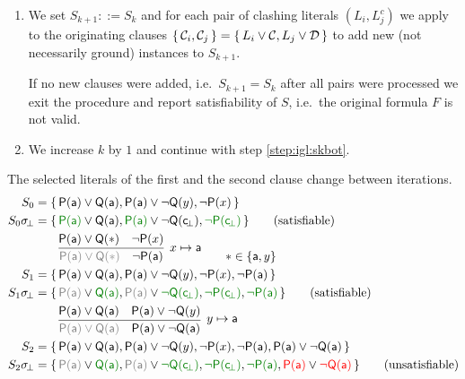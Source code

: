 \begin{procedure}
\begin{enumerate}
		\item We set $S_{k+1} ::= S_k$ and for each pair of clashing literals $(L_i, L^c_j)$
		we apply \InstGen to the originating clauses
		$\{\, \mathcal{C}_{i}, \mathcal{C}_{j}\, \} = \{\,L_i\lor\mathcal{C}, L_j\lor\mathcal{D}\,\}$
		to add new (not necessarily ground) instances to $S_{k+1}$.

		If no new clauses were added, i.e.~$S_{k+1} = S_k$ after all pairs were processed we exit the procedure and report {\myem satisfiability} of $S$, i.e.~the original formula $F$ is not valid.

		\item We increase $k$ by $1$ and continue with step \ref{step:igl:skbot}.

	\end{enumerate}
\end{procedure}

\begin{example} The selected literals of the first and the second clause change between iterations.
\begin{align*}
S_0 &= \{\,
	\mP(\ma)\lor\mQ(\ma),
	\mP(\ma)\lor\lnot\mQ(y),
	\lnot\mP(x)
\,\}
\\
S_0\subsbot &=\{\,
	{\colHi\mP(\ma)}\lor\mQ(\ma),
	{\colHi\mP(\ma)}\lor\lnot\mQ(\consbot),
	{\colHi\lnot\mP(\consbot)}
\,\}
\tag{satisfiable}
\\
&\qquad\infer[
	x\mapsto\ma
	]{
		{\colG \mP(\ma)\lor\mQ(\ast)}\quad\lnot\mP(\ma)
	}{
		\mP(\ma)\lor\mQ(\ast) & \lnot\mP(x)
	}
\tag*{$\ast\in\{\ma,y\}$}
\\
S_1 &=\{\,
	\mP(\ma)\lor\mQ(\ma),
	\mP(\ma)\lor\lnot\mQ(y),
	\lnot\mP(x),
	\lnot\mP(\ma)
\,\}
\\
S_1\subsbot &=\{\,
	{\colG\mP(\ma)}\lor{\colHi\mQ(\ma)},
	{\colG\mP(\ma)}\lor{\colHi\lnot\mQ(\consbot)},
	{\colHi\lnot\mP(\consbot)},
	{\colHi\lnot\mP(\ma)}
\,\}
\tag{satisfiable}
\\
&\qquad\infer[
y\mapsto\ma
]{
	{\colG \mP(\ma)\lor\mQ(\ma)}\quad\mP(\ma)\lor\lnot\mQ(\ma)
}{
	\mP(\ma)\lor\mQ(\ma) & \mP(\ma)\lor\lnot\mQ(y)
}
\\
S_2 &=\{\,
\mP(\ma)\lor\mQ(\ma),
\mP(\ma)\lor\lnot\mQ(y),
\lnot\mP(x),
\lnot\mP(\ma),
\mP(\ma)\lor\lnot\mQ(\ma)
\,\}
\\
S_2\subsbot &=\{\,
{\colG\mP(\ma)}\lor{\colHi\mQ(\ma)},
{\colG\mP(\ma)}\lor{\colHi\lnot\mQ(\consbot)},
{\colHi\lnot\mP(\consbot)},
{\colHi\lnot\mP(\ma)},
{\colLo\mP(\ma)}\lor{\colLo\lnot\mQ(\ma)}
\,\}
\tag{unsatisfiable}
\end{align*}
\end{example}

